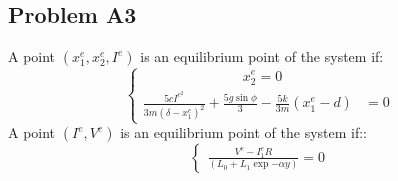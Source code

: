 \subsection*{Problem A3} 
\hfill \break
A point $(x_1^e, x_2^e, I^e)$ is an equilibrium point of the system if:
\hfill \break
\begin{equation}\label{eq:18}
    \begin{cases}
        \hspace{3cm}x_2^e = 0\\    
        \frac{5cI^e^2}{3m(\delta - x_1^e)^2} + \frac{5g\sin{\phi}}{3} - \frac{5k}{3m}(x_1^e -d) &= 0   
    \end{cases}
\end{equation}
\hfill \break
A point $(I^e, V^e)$ is an equilibrium point of the system if::
\hfill \break
\begin{equation}\label{eq:19}
    \begin{cases}
        \frac{V^e - {I_1^e}R}{\left(L_{0} + L_{1}\exp{- \alpha y}\right)}= 0
    \end{cases}
\end{equation}
